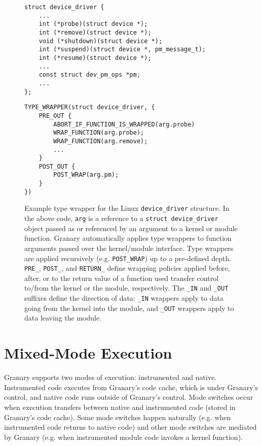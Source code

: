 \documentclass{sigplanconf}
\let\ORIGcaption\caption
\renewcommand{\caption}[2][\compressedcaption]{%
\def\compressedcaption{#2}%
    \vspace{-5pt}%
    \ORIGcaption[#1]{#2}%
    \vspace{-12pt}}
\begin{document}
\begin{figure*}[t!]
\lstset{language=C, tabsize=2, stepnumber=1}
\begin{multicols}{2}
\begin{lstlisting}[basicstyle=\footnotesize\ttfamily]
struct device_driver {
	...
	int (*probe)(struct device *);
	int (*remove)(struct device *);
	void (*shutdown)(struct device *);
	int (*suspend)(struct device *, pm_message_t);
	int (*resume)(struct device *);
	...
	const struct dev_pm_ops *pm;
	...
};
\end{lstlisting}
\columnbreak
\begin{lstlisting}[basicstyle=\footnotesize\ttfamily]
TYPE_WRAPPER(struct device_driver, {
    PRE_OUT {
        ABORT_IF_FUNCTION_IS_WRAPPED(arg.probe)
        WRAP_FUNCTION(arg.probe);
        WRAP_FUNCTION(arg.remove);
        ...
    }
    POST_OUT {
        POST_WRAP(arg.pm);
    }
})
\end{lstlisting}
\end{multicols}
\ORIGcaption[LoF entry]{Example type wrapper for the Linux \texttt{device\_driver} structure. In the above code, \texttt{arg} is a reference to a \texttt{struct device\_driver} object passed as or referenced by an argument to a kernel or module function. Granary automatically applies type wrappers to function arguments passed over the kernel/module interface. Type wrappers are applied recursively (e.g. \texttt{POST\_WRAP}) up to a pre-defined depth. \texttt{PRE\_}, \texttt{POST\_}, and \texttt{RETURN\_} define wrapping policies applied before, after, or to the return value of a function used transfer control to/from the kernel or the module, respectively. The \texttt{\_IN} and \texttt{\_OUT} suffixes define the direction of data: \texttt{\_IN} wrappers apply to data going from the kernel into the module, and \texttt{\_OUT} wrappers apply to data leaving the module.}
\label{fig:type_wrapper}
\end{figure*}

\section{Mixed-Mode Execution}\label{sec:modes}
Granary supports two modes of execution: instrumented and native. Instrumented code executes from Granary's code cache, which is under Granary's control, and native code runs outside of Granary's control. Mode switches occur when execution transfers between native and instrumented code (stored in Granary's code cache). Some mode switches happen naturally (e.g. when instrumented code returns to native code) and other mode switches are mediated by Granary (e.g. when instrumented module code invokes a kernel function).
\end{document}
